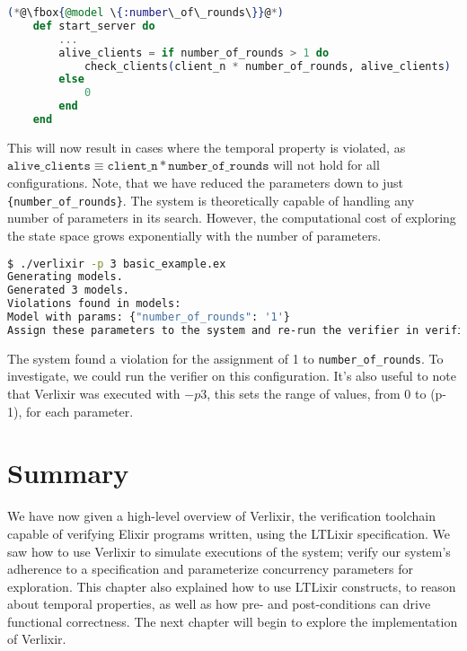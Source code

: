 \begin{lstlisting}[language=Elixir, xleftmargin=.1\linewidth]
    (*@\fbox{@model \{:number\_of\_rounds\}}@*)
    def start_server do
        ...
        alive_clients = if number_of_rounds > 1 do
            check_clients(client_n * number_of_rounds, alive_clients)
        else
            0
        end
    end
\end{lstlisting}
This will now result in cases where the temporal property is violated, as $\texttt{alive\_clients} \equiv \texttt{client\_n} * \texttt{number\_of\_rounds}$ will not hold for all configurations. Note, that we have reduced the parameters down to just \texttt{\{number\_of\_rounds\}}. The system is theoretically capable of handling any number of parameters in its search. However, the computational cost of exploring the state space grows exponentially with the number of parameters.
\begin{lstlisting}[language=bash, xleftmargin=.1\linewidth]
$ ./verlixir -p 3 basic_example.ex
Generating models.
Generated 3 models.
Violations found in models:
Model with params: {"number_of_rounds": '1'}
Assign these parameters to the system and re-run the verifier in verification mode to gather a trace.
\end{lstlisting}
The system found a violation for the assignment of 1 to \texttt{number\_of\_rounds}. To investigate, we could run the verifier on this configuration. It's also useful to note that Verlixir was executed with $-p 3$, this sets the range of values, from 0 to (p-1), for each parameter. 
\section{Summary}
We have now given a high-level overview of Verlixir, the verification toolchain capable of verifying Elixir programs written, using the LTLixir specification. We saw how to use Verlixir to simulate executions of the system; verify our system's adherence to a specification and parameterize concurrency parameters for exploration. This chapter also explained how to use LTLixir constructs, to reason about temporal properties, as well as how pre- and post-conditions can drive functional correctness. The next chapter will begin to explore the implementation of Verlixir.